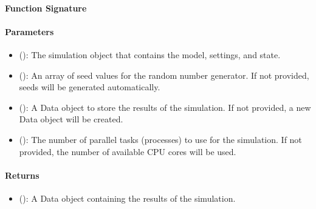 \documentclass[letterpaper,10pt,english]{sphinxmanual}
\begin{document}
\paragraph{Function Signature}
\label{\detokenize{user_guide/drivers/parallel_driver_multiprocessing:function-signature}}
\begin{sphinxVerbatim}[commandchars=\\\{\}]
   
\end{sphinxVerbatim}


\paragraph{Parameters}
\label{\detokenize{user_guide/drivers/parallel_driver_multiprocessing:parameters}}\begin{itemize}
\item {} 
\sphinxAtStartPar
{} (): The simulation object that contains the model, settings, and state.

\item {} 
\sphinxAtStartPar
{} (): An array of seed values for the random number generator. If not provided, seeds will be generated automatically.

\item {} 
\sphinxAtStartPar
{} (): A Data object to store the results of the simulation. If not provided, a new Data object will be created.

\item {} 
\sphinxAtStartPar
{} (): The number of parallel tasks (processes) to use for the simulation. If not provided, the number of available CPU cores will be used.

\end{itemize}


\paragraph{Returns}
\label{\detokenize{user_guide/drivers/parallel_driver_multiprocessing:returns}}\begin{itemize}
\item {} 
\sphinxAtStartPar
{} (): A Data object containing the results of the simulation.

\end{itemize}
\end{document}
